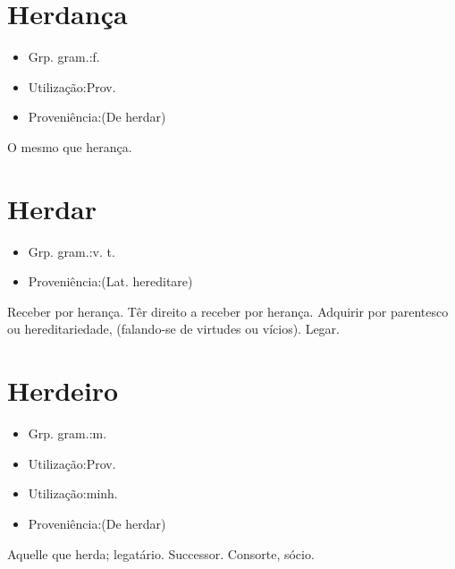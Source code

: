 \documentclass{article}
\begin{document}
\section{Herdança}
\begin{itemize}
\item {Grp. gram.:f.}
\end{itemize}
\begin{itemize}
\item {Utilização:Prov.}
\end{itemize}
\begin{itemize}
\item {Proveniência:(De \textunderscore herdar\textunderscore )}
\end{itemize}
O mesmo que \textunderscore herança\textunderscore .
\section{Herdar}
\begin{itemize}
\item {Grp. gram.:v. t.}
\end{itemize}
\begin{itemize}
\item {Proveniência:(Lat. \textunderscore hereditare\textunderscore )}
\end{itemize}
Receber por herança.
Têr direito a receber por herança.
Adquirir por parentesco ou hereditariedade, (falando-se de virtudes ou vícios).
Legar.
\section{Herdeiro}
\begin{itemize}
\item {Grp. gram.:m.}
\end{itemize}
\begin{itemize}
\item {Utilização:Prov.}
\end{itemize}
\begin{itemize}
\item {Utilização:minh.}
\end{itemize}
\begin{itemize}
\item {Proveniência:(De \textunderscore herdar\textunderscore )}
\end{itemize}
Aquelle que herda; legatário.
Successor.
Consorte, sócio.
\end{document}
